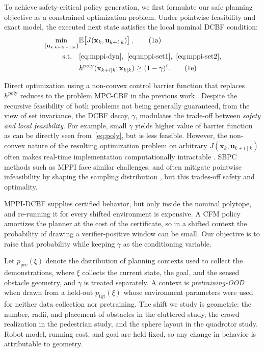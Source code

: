 \documentclass[letterpaper, 10 pt, conference]{ieeeconf}
\newcommand{\x}{\mathbf{x}}
\newcommand{\xk}{\mathbf{\x}_{k\mid k}}
\newcommand{\xki}{\mathbf{\x}_{k+i\mid k}}
\begin{document}
To achieve safety-critical policy generation, we first formulate our safe planning objective as a constrained optimization problem. Under pointwise feasibility and exact model, the executed next state satisfies the local nominal DCBF condition:
\begin{subequations}
\label{eq:sc-mppi}
\begin{align*}
\min_{\{\mathbf{u}_{k:k+H-1\mid k}\}}
& \mathbb{E}\!\left[J(\mathbf{x}_{k}, \mathbf{u}_{k+i\mid k})
\right], \tag{1a} \label{eq:mppi-dcbf}\\
\text{s.t.}\quad
& \eqref{eq:mppi-dyn}, \ \eqref{eq:mppi-set1}, \ \eqref{eq:mppi-set2},\\
& h^{\text{poly}}(\xki;\xk)\ge (1-\gamma)^i. \tag{1e} \label{eq:poly}
\end{align*}
\end{subequations}

Direct optimization using a non-convex control barrier function that replaces $h^\text{poly}$ reduces to the problem MPC-CBF in the previous work \cite{zeng2021safety}. Despite the recursive feasibility of both problems not being generally guaranteed, from the view of set invariance, the DCBF decay,  $\gamma$, modulates the trade-off between \textit{safety and local feasibility}. For example, small $\gamma$ yields higher value of barrier function as can be directly seen from~\eqref{eq:poly}, but is less feasible.  
However, the non-convex nature of the resulting optimization problem on arbitrary $J(\mathbf{x}_{k}, \mathbf{u}_{k+i\mid k})$ often makes real-time implementation computationally intractable \cite{rawlings2020model}. SBPC methods such as MPPI face similar challenges, and often mitigate pointwise infeasibility by shaping the sampling distribution \cite{yin2022, yin2023shield}, but this trades-off safety and optimality. 


{\color{blue}
MPPI-DCBF supplies certified behavior, but only inside the nominal polytope, and re-running it for every shifted environment is expensive. A CFM policy amortizes the planner at the cost of the certificate, so in a shifted context the probability of drawing a verifier-positive window can be small. Our objective is to raise that probability while keeping $\gamma$ as the conditioning variable.

Let $p_{\mathrm{pre}}(\xi)$ denote the distribution of planning contexts used to collect the demonstrations, where $\xi$ collects the current state, the goal, and the sensed obstacle geometry, and $\gamma$ is treated separately. A context is \emph{pretraining-OOD} when drawn from a held-out $p_{\mathrm{tgt}}(\xi)$ whose environment parameters were used for neither data collection nor pretraining. The shift we study is geometric: the number, radii, and placement of obstacles in the cluttered study, the crowd realization in the pedestrian study, and the sphere layout in the quadrotor study. Robot model, running cost, and goal are held fixed, so any change in behavior is attributable to geometry.
}
\end{document}
